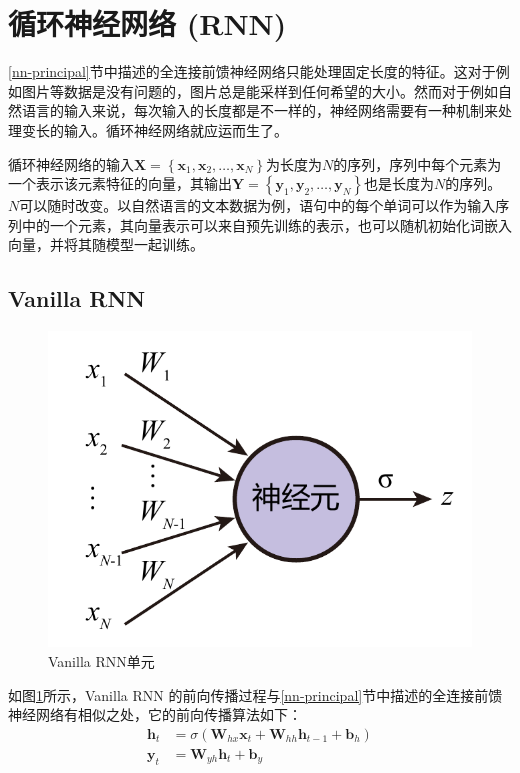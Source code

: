 \section{循环神经网络 (RNN)}

\ref{nn-principal}节中描述的全连接前馈神经网络只能处理固定长度的特征。这对于例如图片等数据是没有问题的，图片总是能采样到任何希望的大小。然而对于例如自然语言的输入来说，每次输入的长度都是不一样的，神经网络需要有一种机制来处理变长的输入。循环神经网络就应运而生了。

循环神经网络的输入$\bm{X}=\left\{\bm{x}_1,\bm{x}_2,\ldots,\bm{x}_N\right\}$为长度为$N$的序列，序列中每个元素为一个表示该元素特征的向量，其输出$\bm{Y}=\left\{\bm{y}_1,\bm{y}_2,\ldots,\bm{y}_N\right\}$也是长度为$N$的序列。$N$可以随时改变。以自然语言的文本数据为例，语句中的每个单词可以作为输入序列中的一个元素，其向量表示可以来自预先训练的表示，也可以随机初始化词嵌入向量，并将其随模型一起训练。

\subsection{Vanilla RNN}

\begin{figure}
    \centering
    \includegraphics[page=3,width=\linewidth]{figure/figures.pdf}
    \caption{Vanilla RNN单元}
    \label{vanilla-rnn}
\end{figure}

如图\ref{vanilla-rnn}所示，Vanilla RNN 的前向传播过程与\ref{nn-principal}节中描述的全连接前馈神经网络有相似之处，它的前向传播算法如下：
\begin{align}
    \bm{h}_t&=\sigma\left(\bm{W}_{hx}\bm{x}_t+\bm{W}_{hh}\bm{h}_{t-1}+\bm{b}_h\right)\\
    \bm{y}_t&=\bm{W}_{yh}\bm{h}_t+\bm{b}_y
\end{align}

